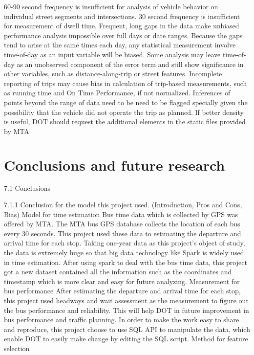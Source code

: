 \documentclass[12pt,journal,compsoc]{IEEEtran}
\begin{document}
60-90 second frequency is insufficient for analysis of vehicle behavior on individual street segments and intersections.
30 second frequency is insufficient for measurement of dwell time.
Frequent, long gaps in the data make unbiased performance analysis impossible over full days or date ranges.  Because the gaps tend to arise at the same times each day, any statistical measurement involve time-of-day as an input variable will be biased.  Some analysis may leave time-of-day as an unobserved component of the error term and still show significance in other variables, such as distance-along-trip or street features.
Incomplete reporting of trips may cause bias in calculation of trip-based measurements, such as running time and On Time Performance, if not normalized.
Inferences of points beyond the range of data need to be need to be flagged specially given the possibility that the vehicle did not operate the trip as planned.
If better density is useful, DOT should request the additional elements in the static files provided by MTA


\section{Conclusions and future research}

7.1 Conclusions

7.1.1 Conclusion for the model this project used. (Introduction, Pros and Cons, Bias)
Model for time estimation
Bus time data which is collected by GPS was offered by MTA. The MTA bus GPS database collects the location of each bus every 30 seconds. This project used these data to estimating the departure and arrival time for each stop.
Taking one-year data as this project’s object of study, the data is extremely huge so that big data technology like Spark is widely used in time estimation.
After using spark to deal with the bus time data, this project got a new dataset contained all the information such as the coordinates and timestamp which is more clear and easy for future analyzing.
Measurement for bus performance
After estimating the departure and arrival time for each stop, this project used headways and wait assessment as the measurement to figure out the bus performance and reliability. This will help DOT in future improvement in bus performance and traffic planning.
 In order to make the work easy to share and reproduce, this project choose to use SQL API to manipulate the data, which enable DOT to easily make change by editing the SQL script. 
Method for feature selection
\end{document}

